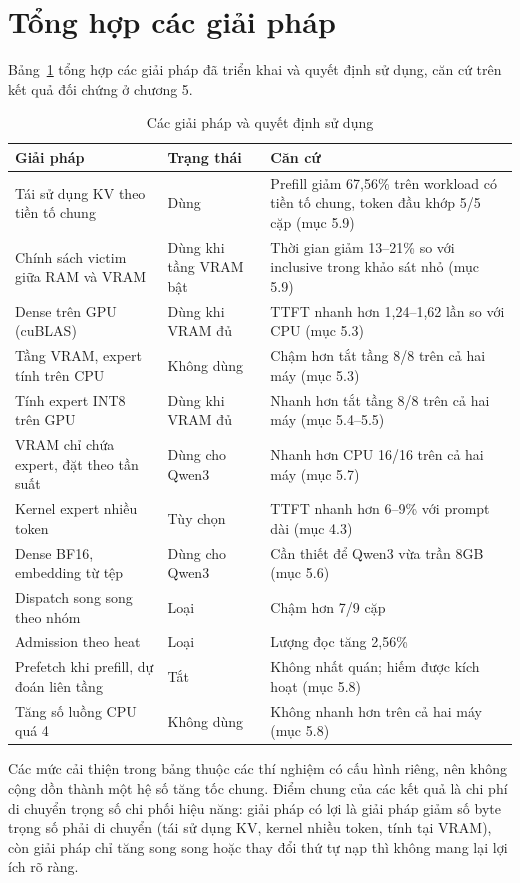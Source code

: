 \section{Tổng hợp các giải pháp}

Bảng~\ref{tab:solutions} tổng hợp các giải pháp đã triển khai và quyết định sử dụng, căn cứ trên kết quả đối chứng ở chương 5.

\begin{table}[htbp]
\centering
\caption{Các giải pháp và quyết định sử dụng}
\label{tab:solutions}
\small
\setlength{\tabcolsep}{3pt}
\begin{tabularx}{\textwidth}{>{\RaggedRight\arraybackslash}p{4.2cm} >{\RaggedRight\arraybackslash}p{2.6cm} >{\RaggedRight\arraybackslash}X}
\toprule
\textbf{Giải pháp} & \textbf{Trạng thái} & \textbf{Căn cứ} \\
\midrule
Tái sử dụng KV theo tiền tố chung & Dùng & Prefill giảm 67,56\% trên workload có tiền tố chung, token đầu khớp 5/5 cặp (mục 5.9) \\
Chính sách victim giữa RAM và VRAM & Dùng khi tầng VRAM bật & Thời gian giảm 13--21\% so với inclusive trong khảo sát nhỏ (mục 5.9) \\
Dense trên GPU (cuBLAS) & Dùng khi VRAM đủ & TTFT nhanh hơn 1,24--1,62 lần so với CPU (mục 5.3) \\
Tầng VRAM, expert tính trên CPU & Không dùng & Chậm hơn tắt tầng 8/8 trên cả hai máy (mục 5.3) \\
Tính expert INT8 trên GPU & Dùng khi VRAM đủ & Nhanh hơn tắt tầng 8/8 trên cả hai máy (mục 5.4--5.5) \\
VRAM chỉ chứa expert, đặt theo tần suất & Dùng cho Qwen3 & Nhanh hơn CPU 16/16 trên cả hai máy (mục 5.7) \\
Kernel expert nhiều token & Tùy chọn & TTFT nhanh hơn 6--9\% với prompt dài (mục 4.3) \\
Dense BF16, embedding từ tệp & Dùng cho Qwen3 & Cần thiết để Qwen3 vừa trần 8GB (mục 5.6) \\
Dispatch song song theo nhóm & Loại & Chậm hơn 7/9 cặp \\
Admission theo heat & Loại & Lượng đọc tăng 2,56\% \\
Prefetch khi prefill, dự đoán liên tầng & Tắt & Không nhất quán; hiếm được kích hoạt (mục 5.8) \\
Tăng số luồng CPU quá 4 & Không dùng & Không nhanh hơn trên cả hai máy (mục 5.8) \\
\bottomrule
\end{tabularx}
\end{table}

Các mức cải thiện trong bảng thuộc các thí nghiệm có cấu hình riêng, nên không cộng dồn thành một hệ số tăng tốc chung. Điểm chung của các kết quả là chi phí di chuyển trọng số chi phối hiệu năng: giải pháp có lợi là giải pháp giảm số byte trọng số phải di chuyển (tái sử dụng KV, kernel nhiều token, tính tại VRAM), còn giải pháp chỉ tăng song song hoặc thay đổi thứ tự nạp thì không mang lại lợi ích rõ ràng.
